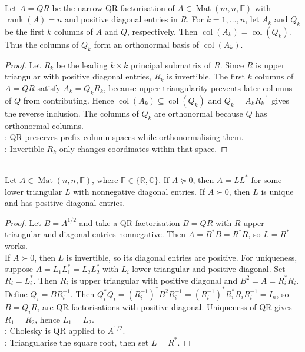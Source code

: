 \begin{corollary} \label{cor:qr-prefix-column-spaces} \\
Let $A=QR$ be the narrow QR factorisation of $A\in\operatorname{Mat}(m,n,\mathbb{F})$ with $\operatorname{rank}(A)=n$ and positive diagonal entries in $R$. For $k=1,\ldots,n$, let $A_k$ and $Q_k$ be the first $k$ columns of $A$ and $Q$, respectively. Then $\operatorname{col}(A_k)=\operatorname{col}(Q_k)$.\\
Thus the columns of $Q_k$ form an orthonormal basis of $\operatorname{col}(A_k)$.
\begin{proof}
Let $R_k$ be the leading $k\times k$ principal submatrix of $R$. Since $R$ is upper triangular with positive diagonal entries, $R_k$ is invertible. The first $k$ columns of $A=QR$ satisfy $A_k=Q_kR_k$, because upper triangularity prevents later columns of $Q$ from contributing. Hence $\operatorname{col}(A_k)\subseteq\operatorname{col}(Q_k)$ and $Q_k=A_kR_k^{-1}$ gives the reverse inclusion. The columns of $Q_k$ are orthonormal because $Q$ has orthonormal columns.\\
: QR preserves prefix column spaces while orthonormalising them.\\
: Invertible $R_k$ only changes coordinates within that space.
\end{proof}
\end{corollary}

\begin{theorem} \label{thm:cholesky-factorization} \\
Let $A\in\operatorname{Mat}(n,n,\mathbb{F})$, where $\mathbb{F}\in\{\mathbb{R},\mathbb{C}\}$. If $A\succeq0$, then $A=LL^*$ for some lower triangular $L$ with nonnegative diagonal entries. If $A\succ0$, then $L$ is unique and has positive diagonal entries.
\begin{proof}
Let $B=A^{1/2}$ and take a QR factorisation $B=QR$ with $R$ upper triangular and diagonal entries nonnegative. Then $A=B^*B=R^*R$, so $L=R^*$ works.\\
If $A\succ0$, then $L$ is invertible, so its diagonal entries are positive. For uniqueness, suppose $A=L_1L_1^*=L_2L_2^*$ with $L_i$ lower triangular and positive diagonal. Set $R_i=L_i^*$. Then $R_i$ is upper triangular with positive diagonal and $B^2=A=R_i^*R_i$. Define $Q_i=BR_i^{-1}$. Then $Q_i^*Q_i=(R_i^{-1})^*B^2R_i^{-1}=(R_i^{-1})^*R_i^*R_iR_i^{-1}=I_n$, so $B=Q_iR_i$ are QR factorisations with positive diagonal. Uniqueness of QR gives $R_1=R_2$, hence $L_1=L_2$.\\
: Cholesky is QR applied to $A^{1/2}$.\\
: Triangularise the square root, then set $L=R^*$.
\end{proof}
\end{theorem}

